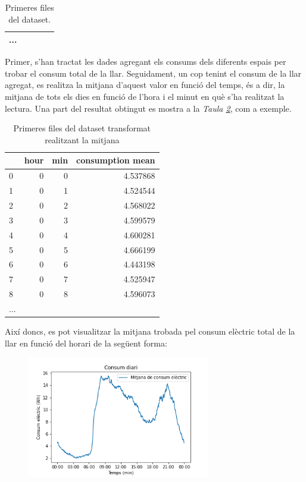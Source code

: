 \begin{itemize}
\begin{table}[H]
\begin{tabular}{llrrr}
				...\\
				\bottomrule
			\end{tabular}
		\caption{Primeres files del dataset.}
		\label{tab:ex-kaggle}
	\end{table}
	Primer, s'han tractat les dades agregant els consums dels diferents espais per trobar el consum total de la llar. Seguidament, un cop tenint el consum de la llar agregat, es realitza la mitjana d'aquest valor en funció del temps, és a dir, la mitjana de tots els dies en funció de l'hora i el minut en què s'ha realitzat la lectura. Una part del resultat obtingut es mostra a la \textit{Taula \ref{tab:ex-kaggle-mean}}, com a exemple.
	\begin{table}[H]
		\centering
		\begin{tabular}{lrrr}
			\toprule
			{} & hour & min & consumption mean \\
			\midrule
			0 &    0 &   0 &    4.537868 \\
			1 &    0 &   1 &    4.524544 \\
			2 &    0 &   2 &    4.568022 \\
			3 &    0 &   3 &    4.599579 \\
			4 &    0 &   4 &    4.600281 \\
			5 &    0 &   5 &    4.666199 \\
			6 &    0 &   6 &    4.443198 \\
			7 &    0 &   7 &    4.525947 \\
			8 &    0 &   8 &    4.596073 \\
			...\\
			\bottomrule
		\end{tabular}
	\caption{Primeres files del dataset transformat realitzant la mitjana}
	\label{tab:ex-kaggle-mean}
	\end{table}
	   Així doncs, es pot visualitzar la mitjana trobada pel consum elèctric total de la llar en funció del horari de la següent forma:
\begin{figure}[H]
	\centering
	\includegraphics[width=8cm]{imgs/cost/consumptionmin.png}

\end{figure}
\end{itemize}

